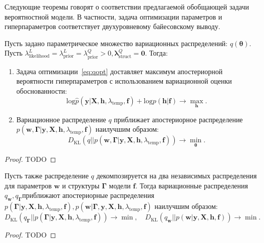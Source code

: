 Следующие теоремы говорят о соответствии предлагаемой обобщающей задачи вероятностной модели. В частности, задача оптимизации параметров и гиперпараметров соответствует двухуровневому байесовскому выводу.
\begin{theorem}
Пусть задано параметрическое множество вариационных распределений: $q(\boldsymbol{\theta})$. 
Пусть ${\lambda^L_\text{likelihood}} = {\lambda^L_\text{prior}=\lambda^Q_\text{prior}}>0, {\boldsymbol{\lambda}^Q_{\text{struct}}}=\mathbf{0}$. Тогда:
\begin{enumerate}
\item Задача оптимизации~\eqref{eq:qopt} доставляет максимум апостериорной вероятности гиперпараметров с использованием вариационной оценки обоснованности:
\vspace{-0.3cm}
\[
    \text{log}\hat{p}(\mathbf{y}|\mathbf{X}, \mathbf{h}, \lambda_\text{temp}, \mathbf{f})+{\text{log}p(\mathbf{h}|\mathbf{f})} \to \max_{\mathbf{h}}.
\]
\item Вариационное распределение $q$ приближает апостериорное распределение $p(\mathbf{w}, \boldsymbol{\Gamma}|\mathbf{y}, \mathbf{X}, \mathbf{h}, \lambda_\text{temp}, \mathbf{f})$ наилучшим образом:
\vspace{-0.3cm}
\[
    {D}_\text{KL}(q||p(\mathbf{w}, \boldsymbol{\Gamma}|\mathbf{y}, \mathbf{X}, \mathbf{h}, \lambda_\text{temp}, \mathbf{f})) \to \min_{\boldsymbol{\theta}}.
\]
\end{enumerate}
\end{theorem}
\begin{proof}
TODO
\end{proof}
\begin{theorem}
Пусть также распределение $q$ декомпозируется на два независимых распределения для параметров $\mathbf{w}$ и структуры $\boldsymbol{\Gamma}$ модели $\mathbf{f}$.
Тогда вариационные распределения $q_{\mathbf{w}}, q_{\boldsymbol{\Gamma}}$приближают апостериорные распределения $ p(\boldsymbol{\Gamma}|\mathbf{y}, \mathbf{X}, \mathbf{h}, \lambda_\text{temp}, \mathbf{f}), p(\mathbf{w}|\boldsymbol{\Gamma},\mathbf{y}, \mathbf{X}, \mathbf{h}, \lambda_\text{temp}, \mathbf{f})$ наилучшим образом:
\[
    {D}_\text{KL}(q_{\boldsymbol{\Gamma}}||p(\boldsymbol{\Gamma}|\mathbf{y}, \mathbf{X}, \mathbf{h}, \lambda_\text{temp}, \mathbf{f})) \to \min, \quad
    {D}_\text{KL}(q_{\mathbf{w}}||p(\mathbf{w}|\mathbf{y}, \mathbf{X}, \mathbf{h}, \mathbf{f})) \to \min.
\]
\end{theorem}
\begin{proof}
TODO
\end{proof}

